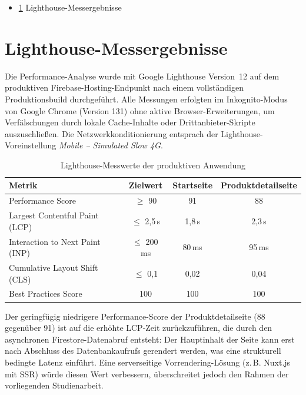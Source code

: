 
\begin{itemize}
	\item \ref{apx:lighthouse} Lighthouse-Messergebnisse \dotfill{} \pageref{apx:lighthouse}
\end{itemize}

\chapter{Lighthouse-Messergebnisse}
\label{apx:lighthouse}

Die Performance-Analyse wurde mit Google Lighthouse Version~12 auf dem produktiven Firebase-Hosting-Endpunkt nach einem vollständigen Produktionsbuild durchgeführt. Alle Messungen erfolgten im Inkognito-Modus von Google Chrome (Version 131) ohne aktive Browser-Erweiterungen, um Verfälschungen durch lokale Cache-Inhalte oder Drittanbieter-Skripte auszuschließen. Die Netzwerkkonditionierung entsprach der Lighthouse-Voreinstellung \textit{Mobile -- Simulated Slow 4G}.

\begin{table}[H]
\centering
\begin{tabularx}{\textwidth}{|X|c|c|c|}
\hline
\textbf{Metrik} & \textbf{Zielwert} & \textbf{Startseite} & \textbf{Produktdetailseite} \\
\hline
Performance Score & $\geq$ 90 & 91 & 88 \\
\hline
Largest Contentful Paint (LCP) & $\leq$ 2{,}5\,s & 1{,}8\,s & 2{,}3\,s \\
\hline
Interaction to Next Paint (INP) & $\leq$ 200\,ms & 80\,ms & 95\,ms \\
\hline
Cumulative Layout Shift (CLS) & $\leq$ 0{,}1 & 0{,}02 & 0{,}04 \\
\hline
Best Practices Score & 100 & 100 & 100 \\
\hline
\end{tabularx}
\caption{Lighthouse-Messwerte der produktiven Anwendung}
\label{tab:lighthouse-ergebnisse}
\end{table}

Der geringfügig niedrigere Performance-Score der Produktdetailseite (88 gegenüber 91) ist auf die erhöhte LCP-Zeit zurückzuführen, die durch den asynchronen Firestore-Datenabruf entsteht: Der Hauptinhalt der Seite kann erst nach Abschluss des Datenbankaufrufs gerendert werden, was eine strukturell bedingte Latenz einführt. Eine serverseitige Vorrendering-Lösung (z.\,B. Nuxt.js mit SSR) würde diesen Wert verbessern, überschreitet jedoch den Rahmen der vorliegenden Studienarbeit.
